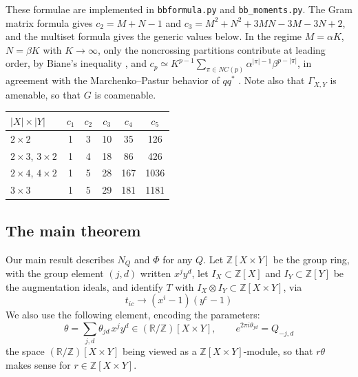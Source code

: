 \documentclass[11pt]{amsart}
\begin{document}
\noindent These formulae are implemented in \texttt{bbformula.py} and \texttt{bb\_moments.py}. The Gram matrix formula gives $c_2=M+N-1$ and $c_3=M^2+N^2+3MN-3M-3N+2$, and the multiset formula gives the generic values below. In the regime $M=\alpha K$, $N=\beta K$ with $K\to\infty$, only the noncrossing partitions contribute at leading order, by Biane's inequality \cite{bia}, and $c_p\simeq K^{p-1}\sum_{\pi\in NC(p)}\alpha^{|\pi|-1}\beta^{p-|\pi|}$, in agreement with the Marchenko--Pastur behavior of $qq^*$ \cite[Lemma 5.3]{bb3}. Note also that $\Gamma_{X,Y}$ is amenable, so that $G$ is coamenable.

\medskip

\begin{center}
\begin{tabular}{lccccc}
\toprule
$|X|\times|Y|$ & $c_1$ & $c_2$ & $c_3$ & $c_4$ & $c_5$\\
\midrule
$2\times2$ & 1 & 3 & 10 & 35 & 126\\
$2\times3$, $3\times2$ & 1 & 4 & 18 & 86 & 426\\
$2\times4$, $4\times2$ & 1 & 5 & 28 & 167 & 1036\\
$3\times3$ & 1 & 5 & 29 & 181 & 1181\\
\bottomrule
\end{tabular}
\end{center}

\subsection{The main theorem}\label{sec:nongen}

Our main result describes $N_Q$ and $\Phi$ for any $Q$. Let $\mathbb Z[X\times Y]$ be the group ring, with the group element $(j,d)$ written $x^jy^d$, let $I_X\subset\mathbb Z[X]$ and $I_Y\subset\mathbb Z[Y]$ be the augmentation ideals, and identify $T$ with $I_X\otimes I_Y\subset\mathbb Z[X\times Y]$, via
$$t_{ic}\to(x^i-1)(y^c-1)$$
We also use the following element, encoding the parameters:
$$\theta=\sum_{j,d}\theta_{jd}\,x^jy^d\in(\mathbb R/\mathbb Z)[X\times Y],\qquad e^{2\pi i\theta_{jd}}=Q_{-j,d}$$
the space $(\mathbb R/\mathbb Z)[X\times Y]$ being viewed as a $\mathbb Z[X\times Y]$-module, so that $r\theta$ makes sense for $r\in\mathbb Z[X\times Y]$.
\end{document}
